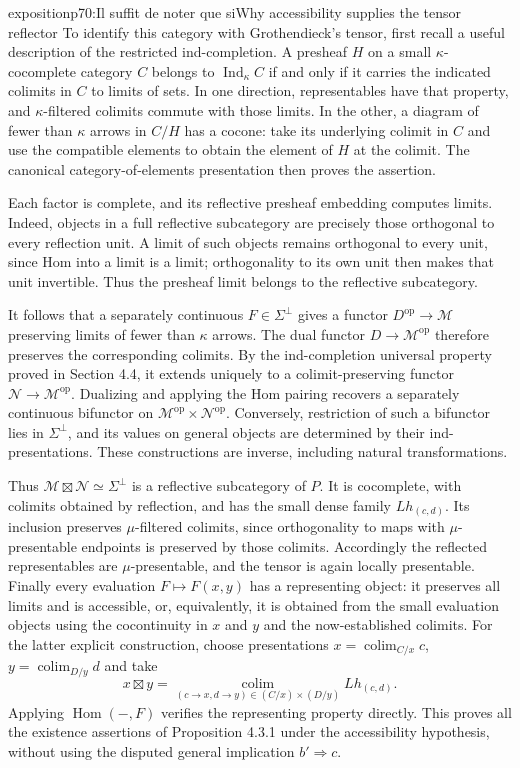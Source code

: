 \begin{dcomment}{exposition}{p70:Il suffit de noter que si}{Why accessibility supplies the tensor reflector}
To identify this category with Grothendieck's tensor, first recall a useful description of the restricted ind-completion.  A presheaf $H$ on a small $\kappa$-cocomplete category $C$ belongs to $\operatorname{Ind}_\kappa C$ if and only if it carries the indicated colimits in $C$ to limits of sets.  In one direction, representables have that property, and $\kappa$-filtered colimits commute with those limits.  In the other, a diagram of fewer than $\kappa$ arrows in $C/H$ has a cocone: take its underlying colimit in $C$ and use the compatible elements to obtain the element of $H$ at the colimit.  The canonical category-of-elements presentation then proves the assertion.

Each factor is complete, and its reflective presheaf embedding computes limits.  Indeed, objects in a full reflective subcategory are precisely those orthogonal to every reflection unit.  A limit of such objects remains orthogonal to every unit, since Hom into a limit is a limit; orthogonality to its own unit then makes that unit invertible.  Thus the presheaf limit belongs to the reflective subcategory.

It follows that a separately continuous $F\in\Sigma^\perp$ gives a functor $D^{\mathrm{op}}\to\mathcal M$ preserving limits of fewer than $\kappa$ arrows.  The dual functor $D\to\mathcal M^{\mathrm{op}}$ therefore preserves the corresponding colimits.  By the ind-completion universal property proved in Section 4.4, it extends uniquely to a colimit-preserving functor $\mathcal N\to\mathcal M^{\mathrm{op}}$.  Dualizing and applying the Hom pairing recovers a separately continuous bifunctor on $\mathcal M^{\mathrm{op}}\times\mathcal N^{\mathrm{op}}$.  Conversely, restriction of such a bifunctor lies in $\Sigma^\perp$, and its values on general objects are determined by their ind-presentations.  These constructions are inverse, including natural transformations.

Thus $\mathcal M\boxtimes\mathcal N\simeq\Sigma^\perp$ is a reflective subcategory of $P$.  It is cocomplete, with colimits obtained by reflection, and has the small dense family $Lh_{(c,d)}$.  Its inclusion preserves $\mu$-filtered colimits, since orthogonality to maps with $\mu$-presentable endpoints is preserved by those colimits.  Accordingly the reflected representables are $\mu$-presentable, and the tensor is again locally presentable.  Finally every evaluation $F\mapsto F(x,y)$ has a representing object: it preserves all limits and is accessible, or, equivalently, it is obtained from the small evaluation objects using the cocontinuity in $x$ and $y$ and the now-established colimits.  For the latter explicit construction, choose presentations $x=\operatorname{colim}_{C/x}c$, $y=\operatorname{colim}_{D/y}d$ and take
\[
 x\boxtimes y
   =\operatorname*{colim}_{(c\to x,d\to y)\in(C/x)\times(D/y)}Lh_{(c,d)}.
\]
Applying $\operatorname{Hom}(-,F)$ verifies the representing property directly.  This proves all the existence assertions of Proposition 4.3.1 under the accessibility hypothesis, without using the disputed general implication $b'\Rightarrow c$.
\end{dcomment}


